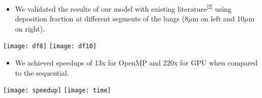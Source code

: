 
\begin{itemize}
\item We validated the results of our model with existing literature\textsuperscript{[2]} using deposition fraction at different segments of the lungs (8$\mu$m on left and 10$\mu$m on right).
\end{itemize}

\vspace{0.3cm}
\begin{center}
  \vspace{-0.4cm}
  \texttt{[image: df8]}%
  \texttt{[image: df10]}
\end{center}
\vspace{0.25em}

\begin{itemize}
\item We achieved speedups of 13x for OpenMP and 220x for GPU when compared to the sequential.
\end{itemize}

\vspace{0.3cm}
\begin{center}
  \vspace{-0.4cm}
  \texttt{[image: speedup]}%
  \texttt{[image: time]}
\end{center}
\vspace{0.25em}
